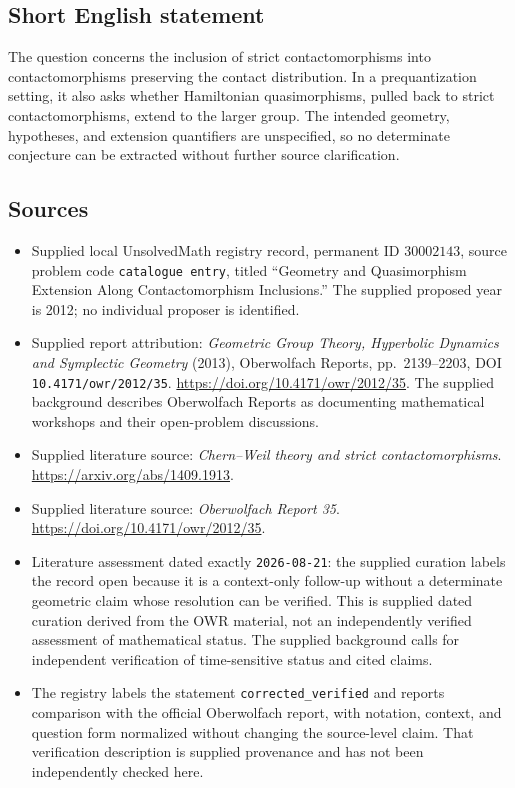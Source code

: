 \documentclass[11pt]{article}
\begin{document}
\subsection{Short English statement}
The question concerns the inclusion of strict contactomorphisms into contactomorphisms preserving the contact distribution. In a prequantization setting, it also asks whether Hamiltonian quasimorphisms, pulled back to strict contactomorphisms, extend to the larger group. The intended geometry, hypotheses, and extension quantifiers are unspecified, so no determinate conjecture can be extracted without further source clarification.
\subsection{Sources}
\begin{itemize}
\item Supplied local UnsolvedMath registry record, permanent ID \(30002143\), source problem code \texttt{catalogue entry}, titled ``Geometry and Quasimorphism Extension Along Contactomorphism Inclusions.'' The supplied proposed year is 2012; no individual proposer is identified.
\item Supplied report attribution: \emph{Geometric Group Theory, Hyperbolic Dynamics and Symplectic Geometry} (2013), Oberwolfach Reports, pp.\ 2139--2203, DOI \texttt{10.4171/owr/2012/35}. \url{https://doi.org/10.4171/owr/2012/35}. The supplied background describes Oberwolfach Reports as documenting mathematical workshops and their open-problem discussions.
\item Supplied literature source: \emph{Chern--Weil theory and strict contactomorphisms}. \url{https://arxiv.org/abs/1409.1913}.
\item Supplied literature source: \emph{Oberwolfach Report 35}. \url{https://doi.org/10.4171/owr/2012/35}.
\item Literature assessment dated exactly \texttt{2026-08-21}: the supplied curation labels the record open because it is a context-only follow-up without a determinate geometric claim whose resolution can be verified. This is supplied dated curation derived from the OWR material, not an independently verified assessment of mathematical status. The supplied background calls for independent verification of time-sensitive status and cited claims.
\item The registry labels the statement \texttt{corrected\_verified} and reports comparison with the official Oberwolfach report, with notation, context, and question form normalized without changing the source-level claim. That verification description is supplied provenance and has not been independently checked here.
\end{itemize}
\end{document}
